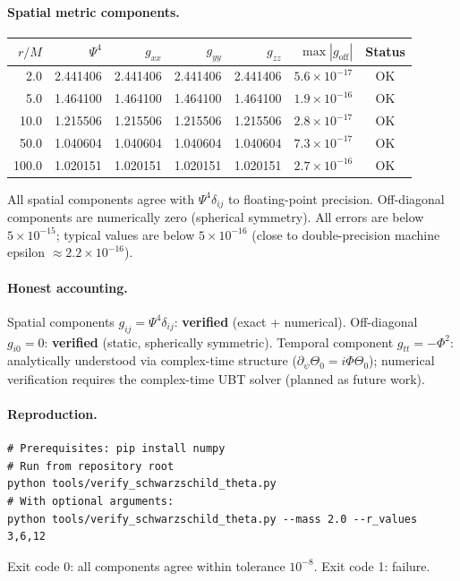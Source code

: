 \documentclass[12pt,a4paper]{article}
\theoremstyle{definition}
\theoremstyle{remark}
\begin{document}
\paragraph{Spatial metric components.}

\begin{center}
\begin{tabular}{rrrrrrc}
\toprule
$r/M$ & $\Psi^4$ & $g_{xx}$ & $g_{yy}$ & $g_{zz}$ & $\max|g_\mathrm{off}|$ & Status \\
\midrule
2.0   & 2.441406 & 2.441406 & 2.441406 & 2.441406 & $5.6\times10^{-17}$ & OK \\
5.0   & 1.464100 & 1.464100 & 1.464100 & 1.464100 & $1.9\times10^{-16}$ & OK \\
10.0  & 1.215506 & 1.215506 & 1.215506 & 1.215506 & $2.8\times10^{-17}$ & OK \\
50.0  & 1.040604 & 1.040604 & 1.040604 & 1.040604 & $7.3\times10^{-17}$ & OK \\
100.0 & 1.020151 & 1.020151 & 1.020151 & 1.020151 & $2.7\times10^{-16}$ & OK \\
\bottomrule
\end{tabular}
\end{center}

All spatial components agree with $\Psi^4\delta_{ij}$ to floating-point precision.
Off-diagonal components are numerically zero (spherical symmetry).
All errors are below $5\times 10^{-15}$; typical values are below $5\times10^{-16}$
(close to double-precision machine epsilon $\approx 2.2\times10^{-16}$).

\paragraph{Honest accounting.}
Spatial components $g_{ij} = \Psi^4\delta_{ij}$: \textbf{verified} (exact + numerical).
Off-diagonal $g_{i0} = 0$: \textbf{verified} (static, spherically symmetric).
Temporal component $g_{tt} = -\Phi^2$: analytically understood via complex-time
structure ($\partial_\psi\Theta_0 = i\Phi\Theta_0$); numerical verification
requires the complex-time UBT solver (planned as future work).

\paragraph{Reproduction.}
\begin{verbatim}
# Prerequisites: pip install numpy
# Run from repository root
python tools/verify_schwarzschild_theta.py
# With optional arguments:
python tools/verify_schwarzschild_theta.py --mass 2.0 --r_values 3,6,12
\end{verbatim}
Exit code 0: all components agree within tolerance $10^{-8}$.
Exit code 1: failure.



\end{document}
